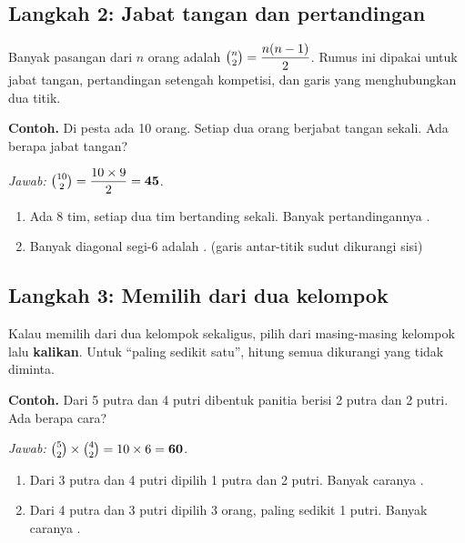 \documentclass[11pt,a4paper]{article}
\begin{document}
\subsection*{Langkah 2: Jabat tangan dan pertandingan}
Banyak pasangan dari $n$ orang adalah $\binom{n}{2} = \dfrac{n(n-1)}{2}$. Rumus ini dipakai untuk
jabat tangan, pertandingan setengah kompetisi, dan garis yang menghubungkan dua titik.

\begin{contoh}
\textbf{Contoh.} Di pesta ada 10 orang. Setiap dua orang berjabat tangan sekali. Ada berapa
jabat tangan?

\textit{Jawab:} $\binom{10}{2} = \dfrac{10 \times 9}{2} = \textbf{45}$.
\end{contoh}

\begin{giliranmu}
\begin{enumerate}[label=\alph*.]
    \item Ada 8 tim, setiap dua tim bertanding sekali. Banyak pertandingannya \kosong.
    \item Banyak diagonal segi-6 adalah \kosong. \quad (garis antar-titik sudut dikurangi sisi)
\end{enumerate}
\end{giliranmu}

\subsection*{Langkah 3: Memilih dari dua kelompok}
Kalau memilih dari dua kelompok sekaligus, pilih dari masing-masing kelompok lalu
\textbf{kalikan}. Untuk ``paling sedikit satu'', hitung semua dikurangi yang tidak diminta.

\begin{contoh}
\textbf{Contoh.} Dari 5 putra dan 4 putri dibentuk panitia berisi 2 putra dan 2 putri.
Ada berapa cara?

\textit{Jawab:} $\binom{5}{2} \times \binom{4}{2} = 10 \times 6 = \textbf{60}$.
\end{contoh}

\begin{giliranmu}
\begin{enumerate}[label=\alph*.]
    \item Dari 3 putra dan 4 putri dipilih 1 putra dan 2 putri. Banyak caranya \kosong.
    \item Dari 4 putra dan 3 putri dipilih 3 orang, paling sedikit 1 putri. Banyak caranya \kosong.
\end{enumerate}
\end{giliranmu}
\end{document}
